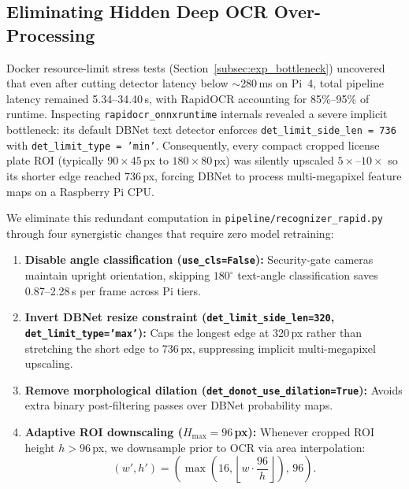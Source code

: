 \documentclass[pdflatex,sn-mathphys-num]{sn-jnl}
\begin{document}
\subsection{Eliminating Hidden Deep OCR Over-Processing}\label{subsec:ocr_opt}
Docker resource-limit stress tests (Section~\ref{subsec:exp_bottleneck}) uncovered that even after cutting detector latency below $\sim$280\,ms on Pi~4, total pipeline latency remained 5.34--34.40\,s, with RapidOCR accounting for 85\%--95\% of runtime. Inspecting \texttt{rapidocr\_onnxruntime} internals revealed a severe implicit bottleneck: its default DBNet text detector enforces \texttt{det\_limit\_side\_len = 736} with \texttt{det\_limit\_type = 'min'}. Consequently, every compact cropped license plate ROI (typically $90\times 45$\,px to $180\times 80$\,px) was silently upscaled $5\times$--$10\times$ so its shorter edge reached 736\,px, forcing DBNet to process multi-megapixel feature maps on a Raspberry Pi CPU.

We eliminate this redundant computation in \texttt{pipeline/recognizer\_rapid.py} through four synergistic changes that require zero model retraining:
\begin{enumerate}
    \item \textbf{Disable angle classification (\texttt{use\_cls=False}):} Security-gate cameras maintain upright orientation, skipping $180^\circ$ text-angle classification saves 0.87--2.28\,s per frame across Pi tiers.
    \item \textbf{Invert DBNet resize constraint (\texttt{det\_limit\_side\_len=320}, \texttt{det\_limit\_type='max'}):} Caps the longest edge at 320\,px rather than stretching the short edge to 736\,px, suppressing implicit multi-megapixel upscaling.
    \item \textbf{Remove morphological dilation (\texttt{det\_donot\_use\_dilation=True}):} Avoids extra binary post-filtering passes over DBNet probability maps.
    \item \textbf{Adaptive ROI downscaling ($H_{\max}=96$\,px):} Whenever cropped ROI height $h > 96$\,px, we downsample prior to OCR via area interpolation:
    \begin{equation}
        (w', h') = \left(\max\!\left(16, \left\lfloor w \cdot \frac{96}{h} \right\rfloor\right), \, 96\right).
    \end{equation}
\end{enumerate}
\end{document}
